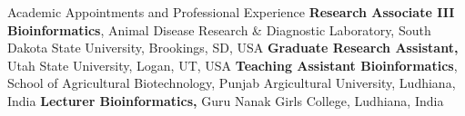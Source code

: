 \begin{rubric}{Academic Appointments and Professional Experience}
        \textbf{Research Associate III Bioinformatics}, Animal Disease Research \& Diagnostic Laboratory, South Dakota State University, Brookings, SD, USA
        \textbf{Graduate Research Assistant,} Utah State University, Logan, UT, USA
        \textbf{Teaching Assistant Bioinformatics}, School of Agricultural Biotechnology, Punjab Argicultural University, Ludhiana, India
        \textbf{Lecturer Bioinformatics,} Guru Nanak Girls College, Ludhiana, India
    \end{rubric}
